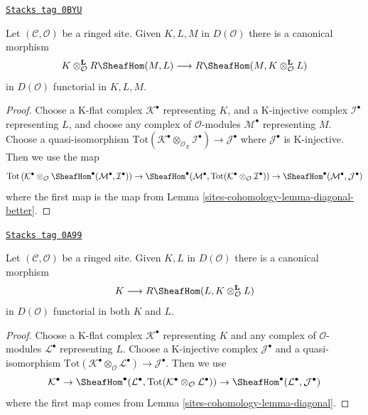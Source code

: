 \begin{lemma}
\label{sites-cohomology-lemma-internal-hom-diagonal-better}
\href{https://stacks.math.columbia.edu/tag/0BYU}{\texttt{Stacks tag 0BYU}}

Let $(\mathcal{C}, \mathcal{O})$ be a ringed site. Given $K, L, M$
in $D(\mathcal{O})$ there is a canonical morphism
$$
K \otimes_\mathcal{O}^\mathbf{L} R\SheafHom(M, L)
\longrightarrow
R\SheafHom(M, K \otimes_\mathcal{O}^\mathbf{L} L)
$$
in $D(\mathcal{O})$ functorial in $K, L, M$.
\end{lemma}

\begin{proof}
Choose a K-flat complex $\mathcal{K}^\bullet$ representing $K$,
and a K-injective complex $\mathcal{I}^\bullet$ representing $L$, and
choose any complex of $\mathcal{O}$-modules $\mathcal{M}^\bullet$
representing $M$. Choose a quasi-isomorphism
$\text{Tot}(\mathcal{K}^\bullet \otimes_{\mathcal{O}_X} \mathcal{I}^\bullet)
\to \mathcal{J}^\bullet$
where $\mathcal{J}^\bullet$ is K-injective. Then we use the map
$$
\text{Tot}\left(
\mathcal{K}^\bullet \otimes_\mathcal{O}
\SheafHom^\bullet(\mathcal{M}^\bullet, \mathcal{I}^\bullet)
\right)
\to
\SheafHom^\bullet(\mathcal{M}^\bullet,
\text{Tot}(\mathcal{K}^\bullet \otimes_\mathcal{O} \mathcal{I}^\bullet))
\to
\SheafHom^\bullet(\mathcal{M}^\bullet, \mathcal{J}^\bullet)
$$
where the first map is the map from Lemma \ref{sites-cohomology-lemma-diagonal-better}.
\end{proof}

\begin{lemma}
\label{sites-cohomology-lemma-internal-hom-diagonal}
\href{https://stacks.math.columbia.edu/tag/0A99}{\texttt{Stacks tag 0A99}}

Let $(\mathcal{C}, \mathcal{O})$ be a ringed site.
Given $K, L$ in $D(\mathcal{O})$ there is a canonical morphism
$$
K \longrightarrow R\SheafHom(L, K \otimes_\mathcal{O}^\mathbf{L} L)
$$
in $D(\mathcal{O})$ functorial in both $K$ and $L$.
\end{lemma}

\begin{proof}
Choose a K-flat complex $\mathcal{K}^\bullet$ representing $K$
and any complex of $\mathcal{O}$-modules $\mathcal{L}^\bullet$
representing $L$. Choose a K-injective complex $\mathcal{J}^\bullet$
and a quasi-isomorphism
$\text{Tot}(\mathcal{K}^\bullet \otimes_\mathcal{O} \mathcal{L}^\bullet)
\to \mathcal{J}^\bullet$. Then we use
$$
\mathcal{K}^\bullet \to
\SheafHom^\bullet(\mathcal{L}^\bullet,
\text{Tot}(\mathcal{K}^\bullet \otimes_\mathcal{O} \mathcal{L}^\bullet))
\to
\SheafHom^\bullet(\mathcal{L}^\bullet, \mathcal{J}^\bullet)
$$
where the first map comes from Lemma \ref{sites-cohomology-lemma-diagonal}.
\end{proof}

